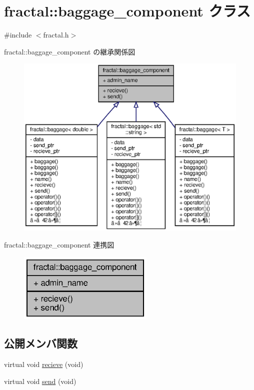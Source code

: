 \section{fractal\+:\+:baggage\+\_\+component クラス}
\label{classfractal_1_1baggage__component}


{\ttfamily \#include $<$fractal.\+h$>$}



fractal\+:\+:baggage\+\_\+component の継承関係図
\nopagebreak
\begin{figure}[H]
\begin{center}
\leavevmode
\includegraphics[width=350pt]{classfractal_1_1baggage__component__inherit__graph}
\end{center}
\end{figure}


fractal\+:\+:baggage\+\_\+component 連携図
\nopagebreak
\begin{figure}[H]
\begin{center}
\leavevmode
\includegraphics[width=184pt]{classfractal_1_1baggage__component__coll__graph}
\end{center}
\end{figure}
\subsection*{公開メンバ関数}
\begin{DoxyCompactItemize}
\item 
virtual void \hyperlink{classfractal_1_1baggage__component_a37ef357c567ca8844d1b83c83e86df74}{recieve} (void)
\item 
virtual void \hyperlink{classfractal_1_1baggage__component_a8fdf9e534f892911e674de5a60eadf64}{send} (void)
\end{DoxyCompactItemize}
